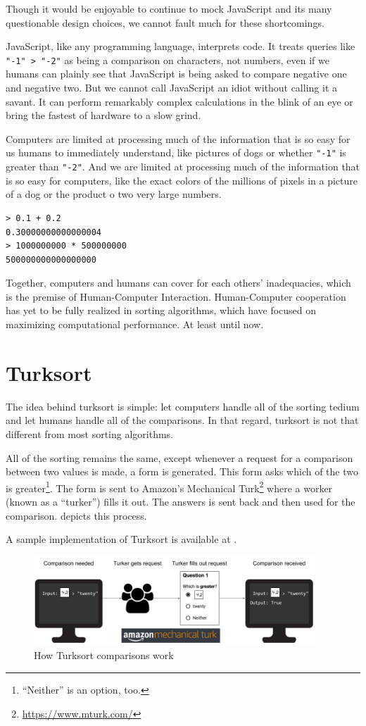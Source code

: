 \documentclass{article}
\begin{document}
Though it would be enjoyable to continue to mock JavaScript and its many
questionable design choices, we cannot fault much for these shortcomings.

JavaScript, like any programming language, interprets code. It treats queries
like \texttt{"-1" > "-2"} as being a comparison on characters, not numbers, even
if we humans can plainly see that JavaScript is being asked to compare negative
one and negative two. But we cannot call JavaScript an idiot without calling it
a savant. It can perform remarkably complex calculations in the blink of an eye
or bring the fastest of hardware to a slow grind.

Computers are limited at processing much of the information that is so easy for
us humans to immediately understand, like pictures of dogs or whether
\texttt{"-1"} is greater than \texttt{"-2"}. And we are limited at processing
much of the information that is so easy for computers, like the exact colors of
the millions of pixels in a picture of a dog or the product o two very large
numbers.

\begin{lstlisting}[caption = Complex Operations in JavaScript (Node.js 12.12.0)]
> 0.1 + 0.2
0.30000000000000004
> 1000000000 * 500000000
500000000000000000
\end{lstlisting}

Together, computers and humans can cover for each others' inadequacies, which is
the premise of Human-Computer Interaction. Human-Computer cooperation has yet to
be fully realized in sorting algorithms, which have focused on maximizing
computational performance. At least until now.

\section{Turksort}

The idea behind turksort is simple: let computers handle all of the sorting
tedium and let humans handle all of the comparisons. In that regard, turksort is
not that different from most sorting algorithms.

All of the sorting remains the same, except whenever a request for a comparison
between two values is made, a form is generated. This form asks which of the two
is greater\footnote{``Neither'' is an option, too.}. The form is sent to
Amazon's Mechanical Turk\footnote{\url{https://www.mturk.com/}} where a worker
(known as a ``turker'') fills it out. The answers is sent back and then used
for the comparison.  depicts this process.

A sample implementation of Turksort is available at \url{}.

\begin{figure}
  \centering
  \includegraphics[width=300pt]{diagram-1.png}
  \caption{How Turksort comparisons work}
  \label{fig:comparison}
\end{figure}
\end{document}
